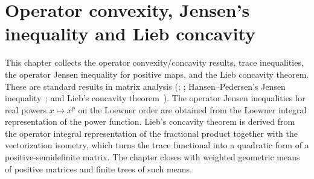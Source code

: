 \chapter{Operator convexity, Jensen's inequality and Lieb concavity}\label{ch:operator_convexity}

This chapter collects the operator convexity/concavity results, trace
inequalities, the operator Jensen inequality for positive maps, and the
Lieb concavity theorem. These are standard results in matrix analysis
(\cite[Chapter~V]{Bhatia1997Matrix}; \cite[Theorems~5.12 and~5.13]{Wolf2012Quantum};
Hansen--Pedersen's Jensen inequality~\cite{HansenPedersen1982Jensen};
and Lieb's concavity theorem~\cite{Lieb1973Convex}). The operator Jensen
inequalities for real powers $x\mapsto x^p$ on the Loewner order are obtained from
the Loewner integral representation of the power function. Lieb's concavity theorem
is derived from the operator integral representation of the fractional product
together with the vectorization isometry, which turns the trace functional into a
quadratic form of a positive-semidefinite matrix. The chapter closes with
weighted geometric means of positive matrices and finite trees of such means.






